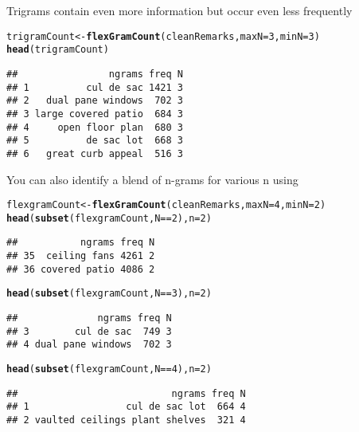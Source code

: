 \documentclass{article}\usepackage[]{graphicx}\usepackage[]{color}
\makeatletter
\newcommand{\hlnum}[1]{\textcolor[rgb]{0.686,0.059,0.569}{#1}}%
\newcommand{\hlopt}[1]{\textcolor[rgb]{0,0,0}{#1}}%
\newcommand{\hlstd}[1]{\textcolor[rgb]{0.345,0.345,0.345}{#1}}%
\newcommand{\hlkwb}[1]{\textcolor[rgb]{0.69,0.353,0.396}{#1}}%
\newcommand{\hlkwc}[1]{\textcolor[rgb]{0.333,0.667,0.333}{#1}}%
\newcommand{\hlkwd}[1]{\textcolor[rgb]{0.737,0.353,0.396}{\textbf{#1}}}%
\newenvironment{kframe}{%
 \def\at@end@of@kframe{}%
 \ifinner\ifhmode%
  \def\at@end@of@kframe{\end{minipage}}%
  \begin{minipage}{\columnwidth}%
 \fi\fi%
 \def\FrameCommand##1{\hskip\@totalleftmargin \hskip-\fboxsep
 \colorbox{shadecolor}{##1}\hskip-\fboxsep
     \hskip-\linewidth \hskip-\@totalleftmargin \hskip\columnwidth}%
 \MakeFramed {\advance\hsize-\width
   \@totalleftmargin\z@ \linewidth\hsize
   \@setminipage}}%
 {\par\unskip\endMakeFramed%
 \at@end@of@kframe}
\newenvironment{knitrout}{}{} %
\makeatother
\begin{document}
\noindent Trigrams contain even more information but occur even less frequently
\begin{knitrout}\footnotesize
{}\color{fgcolor}\begin{kframe}
\begin{alltt}
\hlstd{trigramCount} \hlkwb{<-} \hlkwd{flexGramCount}\hlstd{(cleanRemarks ,} \hlkwc{maxN}\hlstd{=}\hlnum{3} \hlstd{,} \hlkwc{minN}\hlstd{=}\hlnum{3}\hlstd{)}
\hlkwd{head}\hlstd{(trigramCount)}
\end{alltt}
\begin{verbatim}
##                ngrams freq N
## 1          cul de sac 1421 3
## 2   dual pane windows  702 3
## 3 large covered patio  684 3
## 4     open floor plan  680 3
## 5          de sac lot  668 3
## 6   great curb appeal  516 3
\end{verbatim}
\end{kframe}
\end{knitrout}

You can also identify a blend of n-grams for various n using
\begin{knitrout}\footnotesize
{}\color{fgcolor}\begin{kframe}
\begin{alltt}
\hlstd{flexgramCount} \hlkwb{<-} \hlkwd{flexGramCount}\hlstd{(cleanRemarks ,} \hlkwc{maxN}\hlstd{=}\hlnum{4} \hlstd{,} \hlkwc{minN}\hlstd{=}\hlnum{2}\hlstd{)}
\hlkwd{head}\hlstd{(}\hlkwd{subset}\hlstd{(flexgramCount , N}\hlopt{==}\hlnum{2}\hlstd{) ,} \hlkwc{n}\hlstd{=}\hlnum{2}\hlstd{)}
\end{alltt}
\begin{verbatim}
##           ngrams freq N
## 35  ceiling fans 4261 2
## 36 covered patio 4086 2
\end{verbatim}
\begin{alltt}
\hlkwd{head}\hlstd{(}\hlkwd{subset}\hlstd{(flexgramCount , N}\hlopt{==}\hlnum{3}\hlstd{) ,} \hlkwc{n}\hlstd{=}\hlnum{2}\hlstd{)}
\end{alltt}
\begin{verbatim}
##              ngrams freq N
## 3        cul de sac  749 3
## 4 dual pane windows  702 3
\end{verbatim}
\begin{alltt}
\hlkwd{head}\hlstd{(}\hlkwd{subset}\hlstd{(flexgramCount , N}\hlopt{==}\hlnum{4}\hlstd{) ,} \hlkwc{n}\hlstd{=}\hlnum{2}\hlstd{)}
\end{alltt}
\begin{verbatim}
##                           ngrams freq N
## 1                 cul de sac lot  664 4
## 2 vaulted ceilings plant shelves  321 4
\end{verbatim}
\end{kframe}
\end{knitrout}
\end{document}
